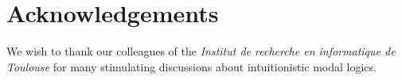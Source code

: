 \documentclass[draft]{article}
\def\Rule{\mathbf{R}}
\begin{document}
\section*{Acknowledgements}
%
%
We wish to thank our colleagues of the {\em Institut de recherche en informatique de Toulou\-se}\/ for many stimulating discussions about intuitionistic modal logics.
%
%
%
%
%
%
%
%
%
%
%
%
%
%
%
%
%
%
%
%
%
%
%
%
%
%
%
%
%
%
%
%
%
%
%
%
%
%
%
%
%
%
%
%
%
%
%
%
%
%
%
%
%
%
%
%
\end{document}
